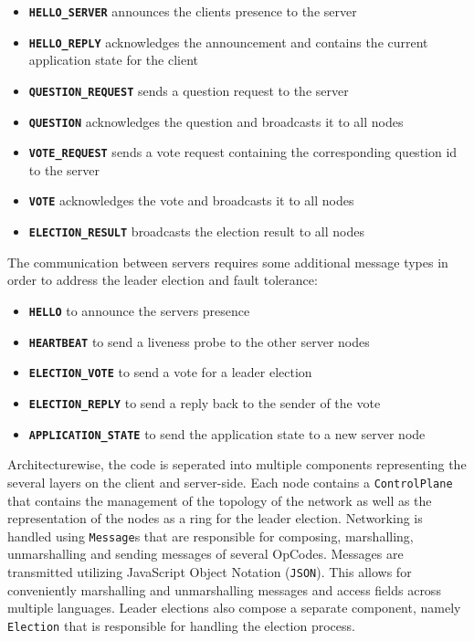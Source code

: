 \documentclass[runningheads]{llncs}
\begin{document}
\begin{itemize}
    \item \textbf{\texttt{HELLO\_SERVER}} announces the clients presence to the server 
    \item \textbf{\texttt{HELLO\_REPLY}} acknowledges the announcement and contains the current application state for the client
    \item \textbf{\texttt{QUESTION\_REQUEST}} sends a question request to the server
    \item \textbf{\texttt{QUESTION}} acknowledges the question and broadcasts it to all nodes
    \item \textbf{\texttt{VOTE\_REQUEST}} sends a vote request containing the corresponding question id to the server
    \item \textbf{\texttt{VOTE}} acknowledges the vote and broadcasts it to all nodes
    \item \textbf{\texttt{ELECTION\_RESULT}} broadcasts the election result to all nodes
\end{itemize}

The communication between servers requires some additional message types in
order to address the leader election and fault tolerance:

\begin{itemize}
    \item \textbf{\texttt{HELLO}} to announce the servers presence
    \item \textbf{\texttt{HEARTBEAT}} to send a liveness probe to the other server nodes
    \item \textbf{\texttt{ELECTION\_VOTE}} to send a vote for a leader election
    \item \textbf{\texttt{ELECTION\_REPLY}} to send a reply back to the sender of the vote
    \item \textbf{\texttt{APPLICATION\_STATE}} to send the application state to a new server node
\end{itemize}

Architecturewise, the code is seperated into multiple components representing
the several layers on the client and server-side. Each node contains a
\texttt{ControlPlane} that contains the management of the topology of the
network as well as the representation of the nodes as a ring for the leader
election. Networking is handled using \texttt{Message}s that are responsible
for composing, marshalling, unmarshalling and sending messages of several
OpCodes. Messages are transmitted utilizing JavaScript Object Notation (\texttt{JSON}).
This allows for conveniently marshalling and unmarshalling messages and access
fields across multiple languages. Leader elections also compose a separate component, namely \texttt{Election}
that is responsible for handling the election process.
\end{document}
